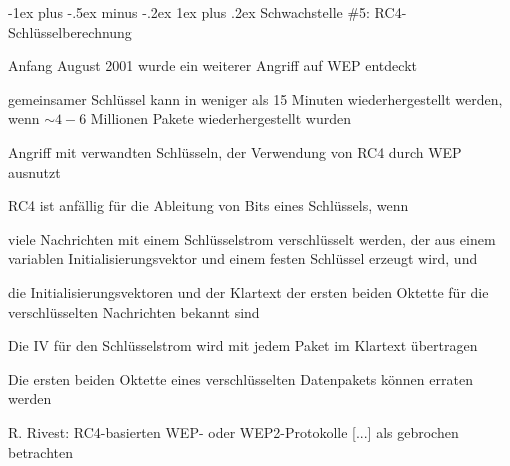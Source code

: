 \documentclass[a4paper]{article}
\makeatletter
\renewcommand{\subsubsection}{\@startsection{subsubsection}{3}{0mm}%
 {-1ex plus -.5ex minus -.2ex}%
 {1ex plus .2ex}%
 {\normalfont\small\bfseries}}
\makeatother
\begin{document}
\begin{multicols}{3}
      \subsubsection{Schwachstelle \#5: RC4-Schlüsselberechnung}
      \begin{itemize*}
            \item Anfang August 2001 wurde ein weiterer Angriff auf WEP entdeckt
            \item gemeinsamer Schlüssel kann in weniger als 15 Minuten wiederhergestellt werden, wenn $\sim 4-6$ Millionen Pakete wiederhergestellt wurden
            \item Angriff mit verwandten Schlüsseln, der Verwendung von RC4 durch WEP ausnutzt
            \begin{itemize*}
                  \item RC4 ist anfällig für die Ableitung von Bits eines Schlüssels, wenn
                  \begin{itemize*}
                        \item viele Nachrichten mit einem Schlüsselstrom verschlüsselt werden, der aus einem variablen Initialisierungsvektor und einem festen Schlüssel erzeugt wird, und
                        \item die Initialisierungsvektoren und der Klartext der ersten beiden Oktette für die verschlüsselten Nachrichten bekannt sind
                  \end{itemize*}
                  \item Die IV für den Schlüsselstrom wird mit jedem Paket im Klartext übertragen
                  \item Die ersten beiden Oktette eines verschlüsselten Datenpakets können erraten werden
            \end{itemize*}
            \item R. Rivest: RC4-basierten WEP- oder WEP2-Protokolle [...] als gebrochen betrachten
      \end{itemize*}


\end{multicols}
\end{document}
